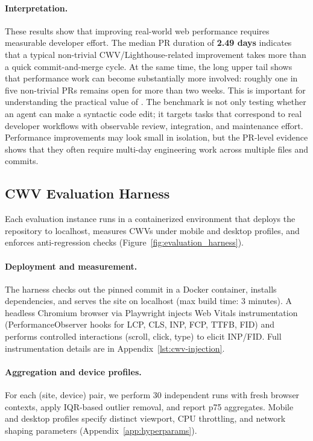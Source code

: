 \paragraph{Interpretation.}
These results show that improving real-world web performance requires measurable developer effort. The median PR duration of \textbf{2.49 days} indicates that a typical non-trivial CWV/Lighthouse-related improvement takes more than a quick commit-and-merge cycle. At the same time, the long upper tail shows that performance work can become substantially more involved: roughly one in five non-trivial PRs remains open for more than two weeks. This is important for understanding the practical value of \OurBench. The benchmark is not only testing whether an agent can make a syntactic code edit; it targets tasks that correspond to real developer workflows with observable review, integration, and maintenance effort. Performance improvements may look small in isolation, but the PR-level evidence shows that they often require multi-day engineering work across multiple files and commits.
\subsection{CWV Evaluation Harness}
\label{sec:cwv-evaluation}
Each evaluation instance runs in a containerized environment that deploys the repository to localhost, measures CWVs under mobile and desktop profiles, and enforces anti-regression checks (Figure~\ref{fig:evaluation_harness}).

\paragraph{Deployment and measurement.}
The harness checks out the pinned commit in a Docker container, installs dependencies, and serves the site on localhost (max build time: 3 minutes). A headless Chromium browser via Playwright injects Web Vitals instrumentation (PerformanceObserver hooks for LCP, CLS, INP, FCP, TTFB, FID) and performs controlled interactions (scroll, click, type) to elicit INP/FID. Full instrumentation details are in Appendix~\ref{lst:cwv-injection}.

\paragraph{Aggregation and device profiles.}
For each (site, device) pair, we perform 30 independent runs with fresh browser contexts, apply IQR-based outlier removal, and report p75 aggregates. Mobile and desktop profiles specify distinct viewport, CPU throttling, and network shaping parameters (Appendix~\ref{app:hyperparams}).


